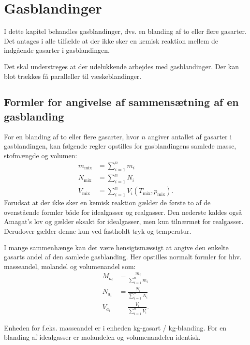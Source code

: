 
\section{Gasblandinger} \label{afs:gasblanding}
I dette kapitel behandles gasblandinger, dvs. en blanding af to eller flere gasarter. Det antages i alle tilfælde at der ikke sker en kemisk reaktion mellem de indgående gasarter i gasblandingen.

Det skal understreges at der udelukkende arbejdes med gasblandinger. Der kan blot trækkes få paralleller til væskeblandinger.

\subsection{Formler for angivelse af sammensætning af en gasblanding}
For en blanding af to eller flere gasarter, hvor $n$ angiver antallet af gasarter i gasblandingen, kan følgende regler opstilles for gasblandingens samlede masse, stofmængde og volumen:
\begin{align*}
  m_{\mathrm{mix}} &= \sum_{i = 1}^{n} m_i \\
  N_{\mathrm{mix}} &= \sum_{i = 1}^{n} N_i \\
  V_{\mathrm{mix}} &= \sum_{i = 1}^{n} V_i (T_{\mathrm{mix}}, p_{\mathrm{mix}})
.\end{align*}
Forudsat at der ikke sker en kemisk reaktion gælder de første to af de ovenstående formler både for idealgasser og realgasser. Den nederste kaldes også Amagat's lov og gælder eksakt for idealgasser, men kun tilnærmet for realgasser. Derudover gælder denne kun ved fastholdt tryk og temperatur.

I mange sammenhænge kan det være hensigtsmæssigt at angive den enkelte gasarts andel af den samlede gasblanding. Her opstilles normalt formler for hhv. masseandel, molandel og volumenandel som:
\begin{align*}
  M_{a_i} &= \frac{m_i}{\sum_{i = 1}^{n} m_i} \\
  N_{a_i} &= \frac{N_i}{\sum_{i = 1}^{n} N_i} \\
  V_{a_i} &= \frac{V_i}{\sum_{i = 1}^{n} V_i}
.\end{align*}

Enheden for f.eks. masseandel er i enheden kg-gasart / kg-blanding. For en blanding af idealgasser er molandelen og volumenandelen identisk.

